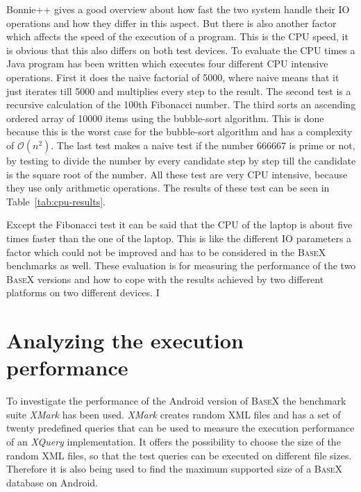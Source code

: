 Bonnie++ gives a good overview about how fast the two system handle their IO operations and how they differ in this aspect.
But there is also another factor which affects the speed of the execution of a program.
This is the CPU speed, it is obvious that this also differs on both test devices.
To evaluate the CPU times a Java program has been written which executes four different CPU intensive operations.
First it does the naive factorial of 5000, where naive means that it just iterates till 5000 and multiplies every step to the result.
The second test is a recursive calculation of the 100th Fibonacci number.
The third sorts an ascending ordered array of 10000 items using the bubble-sort algorithm.
This is done because this is the worst case for the bubble-sort algorithm and has a complexity of $\mathcal O(n^2)$.
The last test makes a naive test if the number 666667 is prime or not, by testing to divide the number by every candidate step by step till the candidate is the square root of the number.
All these test are very CPU intensive, because they use only arithmetic operations.
The results of these test can be seen in Table~\ref{tab:cpu-results}.

Except the Fibonacci test it can be said that the CPU of the laptop is about five times faster than the one of the laptop.
This is like the different IO parameters a factor which could not be improved and has to be considered in the \textsc{BaseX} benchmarks as well.
These evaluation is for measuring the performance of the two \textsc{BaseX} versions and how to cope with the results achieved by two different platforms on two different devices.
I

\section{Analyzing the execution performance}
\label{sec:analysing-the-execution-performance}
To investigate the performance of the Android version of \textsc{BaseX} the benchmark suite \textit{XMark} has been used.
\textit{XMark} creates random XML files and has a set of twenty predefined queries that can be used to measure the execution performance of an \textit{XQuery} implementation.
It offers the possibility to choose the size of the random XML files, so that the test queries can be executed on different file sizes.
Therefore it is also being used to find the maximum supported size of a \textsc{BaseX} database on Android.


